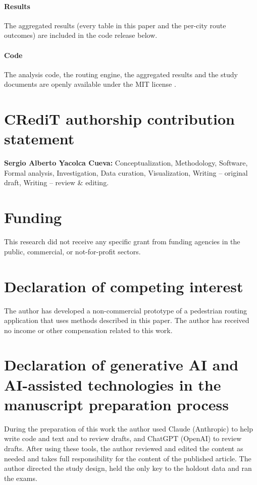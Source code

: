 \documentclass[preprint,12pt,authoryear]{elsarticle}
\begin{document}
\paragraph{Results} The aggregated results (every table in this paper and the per-city route outcomes) are included in the code release below.

\paragraph{Code} The analysis code, the routing engine, the aggregated results and the study documents are openly available under the MIT license \citep{codigo_zenodo}.

\section*{CRediT authorship contribution statement}
\textbf{Sergio Alberto Yacolca Cueva:} Conceptualization, Methodology, Software, Formal analysis, Investigation, Data curation, Visualization, Writing -- original draft, Writing -- review \& editing.

\section*{Funding}
This research did not receive any specific grant from funding agencies in the public, commercial, or not-for-profit sectors.

\section*{Declaration of competing interest}
The author has developed a non-commercial prototype of a pedestrian routing application that uses methods described in this paper. The author has received no income or other compensation related to this work.

\section*{Declaration of generative AI and AI-assisted technologies in the manuscript preparation process}
During the preparation of this work the author used Claude (Anthropic) to help write code and text and to review drafts, and ChatGPT (OpenAI) to review drafts. After using these tools, the author reviewed and edited the content as needed and takes full responsibility for the content of the published article. The author directed the study design, held the only key to the holdout data and ran the exams.
\end{document}
